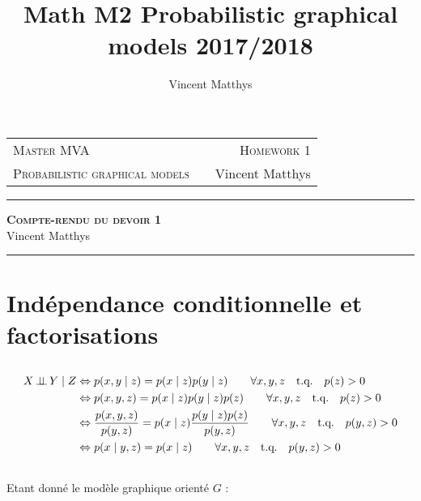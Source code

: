 \documentclass[12pt,a4paper,onecolumn]{article}
\title{Math M2 Probabilistic graphical models 2017/2018}
\author{Vincent Matthys}
\begin{document}
\begin{tabularx}{0.8\textwidth}{@{} l X r @{} }
	{\textsc{Master MVA}}                   &  & \textsc{Homework 1} \\
	\textsc{Probabilistic graphical models} &  & {Vincent Matthys}   \\
\end{tabularx}
\vspace{1.5cm}
\begin{center}
	\rule[11pt]{5cm}{0.5pt}

	\textbf{\LARGE \textsc{Compte-rendu du devoir 1}}
	\vspace{0.5cm}\\
	Vincent Matthys\\
	\rule{5cm}{0.5pt}
	\vspace{1.5cm}
\end{center}

\section{Indépendance conditionnelle et factorisations}

\subsection{}

\begin{equation}
	\begin{split}
		X \,\bot\!\!\!\bot\, Y \mid Z &\Leftrightarrow p(x, y \mid z) = p(x \mid z) p(y \mid z) \qquad \forall x, y, z \quad  \text{t.q.} \quad p(z) > 0 \\
		&\Leftrightarrow p(x, y, z) = p(x \mid z) p(y \mid z) p(z)\qquad \forall x, y, z \quad  \text{t.q.} \quad p(z) > 0 \\
		&\Leftrightarrow \frac{p(x, y ,z)}{p(y , z)} = p(x \mid z) \frac{p(y \mid z) p(z)}{p(y, z)} \qquad \forall x, y, z \quad  \text{t.q.} \quad p(y, z) > 0 \\
		&\Leftrightarrow p(x \mid y, z) = p(x \mid z) \qquad \forall x, y, z \quad  \text{t.q.} \quad p(y, z) > 0 \\
	\end{split}
\end{equation}

\subsection{}

Etant donné le modèle graphique orienté \(G\) :
\end{document}

